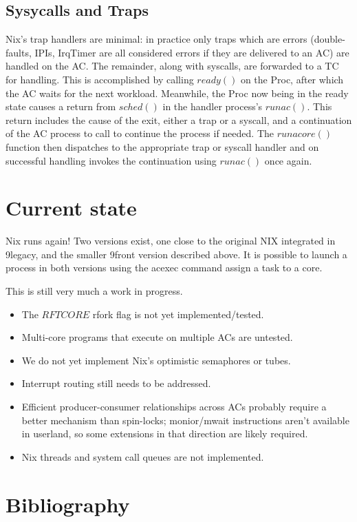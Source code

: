 \documentclass{article}
\begin{document}
\subsection{Sysycalls and Traps}
Nix's trap handlers are minimal: in practice only traps which are errors (double-faults, IPIs, IrqTimer are all considered errors if they are delivered to an AC) are handled on the AC.  The remainder, along with syscalls, are forwarded to a TC for handling.
This is accomplished by calling $ready()$ on the Proc, after which the AC waits for the next workload.
Meanwhile, the Proc now being in the ready state causes a return from $sched()$ in the handler process's $runac()$.
This return includes the cause of the exit, either a trap or a syscall, and a continuation of the AC process to call to continue the process if needed.
The $runacore()$ function then dispatches to the appropriate trap or syscall handler and on successful handling invokes the continuation using $runac()$ once again.

\section{Current state}
Nix runs again! 
Two versions exist, one close to the original NIX integrated in 9legacy, and the smaller 9front version described above.
It is possible to launch a process in both versions using the acexec command assign a task to a core.  

This is still very much a work in progress.
\begin{itemize}
\item The $RFTCORE$ rfork flag is not yet implemented/tested.
\item Multi-core programs that execute on multiple ACs are untested.
\item We do not yet implement Nix's optimistic semaphores or tubes.
\item Interrupt routing still needs to be addressed.
\item Efficient producer-consumer relationships across ACs probably require a better mechanism than spin-locks; monior/mwait instructions aren't available in userland, so some extensions in that direction are likely required.
\item Nix threads and system call queues are not implemented.
\end{itemize}

\section{Bibliography}


\end{document}
